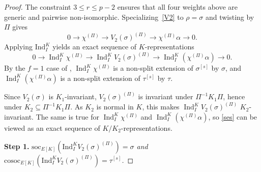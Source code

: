 \documentclass[a4paper,10pt,twoside]{amsart}
\DeclareMathOperator{\Ind}{Ind}
\theoremstyle{definition}
\numberwithin{equation}{section}
\begin{document}
\begin{proof}
The constraint $3\leq r\leq p-2$ ensures that all four weights above are
generic and pairwise non-isomorphic. Specializing~\eqref{V2} to
$\rho=\sigma$ and twisting by $\Pi$ gives
\[
0 \longrightarrow \chi^{(\Pi)} \longrightarrow V_2(\sigma)^{(\Pi)}
\longrightarrow \chi^{(\Pi)} \alpha \longrightarrow 0.
\]
Applying $\mathrm{Ind}_I^K$ yields an exact sequence of
$K$-representations
\begin{equation}\label{ses}
0 \longrightarrow \Ind_I^K\chi^{(\Pi)}
\longrightarrow \Ind_I^K V_2(\sigma)^{(\Pi)}
\longrightarrow \Ind_I^K(\chi^{(\Pi)}\alpha)
\longrightarrow 0.
\end{equation}
By the \(f=1\) case of \cite[Theorem~2.4]{BP12}, \(\Ind_I^K\chi^{(\Pi)}\) is a non-split
extension of \(\sigma^{[s]}\) by \(\sigma\), and \(\Ind_I^K(\chi^{(\Pi)}\alpha)\) is a non-split
extension of \(\tau^{[s]}\) by \(\tau\). 

Since \(V_2(\sigma)\) is \(K_1\)-invariant,
\(V_2(\sigma)^{(\Pi)}\) is invariant under \(\Pi^{-1} K_1\Pi\), hence under
\(K_2\subseteq \Pi^{-1} K_1\Pi\). As \(K_2\) is normal in \(K\), this makes
\(\Ind_I^K V_2(\sigma)^{(\Pi)}\) \(K_2\)-invariant. The same is true for
\(\Ind_I^K\chi^{(\Pi)}\) and \(\Ind_I^K(\chi^{(\Pi)}\alpha)\), so \eqref{ses} can be viewed as an exact sequence of
\(K/K_2\)-representations.

\medskip
\noindent\textbf{Step 1.}
\textit{$\mathrm{soc}_{E[K]}(\mathrm{Ind}_I^K V_2(\sigma)^{(\Pi)}) =
\sigma$ and $\mathrm{cosoc}_{E[K]}(\mathrm{Ind}_I^K V_2(\sigma)^{(\Pi)}) =
\tau^{[s]}$.}


\end{proof}
\end{document}

